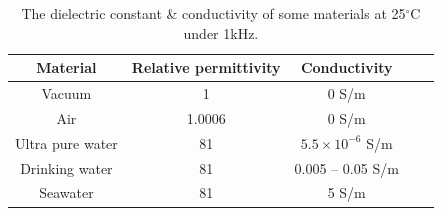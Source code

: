 \begin{table}[htbp]
    \centering
    \caption{The dielectric constant \& conductivity of some materials at 25$^\circ$C under 1kHz.}
    \begin{tabular}{ |c|c|c|m{3.5cm}<{\centering}|m{3.5cm}<{\centering}| }
        \hline
        \textbf{Material} & \textbf{Relative permittivity} & \textbf{Conductivity}    \\\hline
        Vacuum            & 1                              & 0 S/m                    \\ \hline
        Air               & 1.0006                         & 0 S/m                    \\ \hline
        Ultra pure water  & 81                             & $5.5 \times 10^{-6}$ S/m \\ \hline
        Drinking water    & 81                             & 0.005 – 0.05 S/m         \\ \hline
        Seawater          & 81                             & 5 S/m                    \\ \hline
    \end{tabular}
    \label{table:permittivity}
\end{table}
